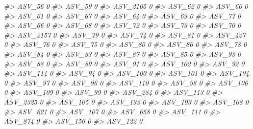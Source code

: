 \documentclass[
]{article}
\newenvironment{Shaded}{\begin{snugshade}}{\end{snugshade}}
\newcommand{\CommentTok}[1]{\textcolor[rgb]{0.56,0.35,0.01}{\textit{#1}}}
\begin{document}
\begin{Shaded}
\begin{Highlighting}[]
\CommentTok{\#\textgreater{} ASV\_56    0}
\CommentTok{\#\textgreater{} ASV\_59    0}
\CommentTok{\#\textgreater{} ASV\_2105  0}
\CommentTok{\#\textgreater{} ASV\_62    0}
\CommentTok{\#\textgreater{} ASV\_60    0}
\CommentTok{\#\textgreater{} ASV\_61    0}
\CommentTok{\#\textgreater{} ASV\_67    0}
\CommentTok{\#\textgreater{} ASV\_64    0}
\CommentTok{\#\textgreater{} ASV\_69    0}
\CommentTok{\#\textgreater{} ASV\_77    0}
\CommentTok{\#\textgreater{} ASV\_66    0}
\CommentTok{\#\textgreater{} ASV\_68    0}
\CommentTok{\#\textgreater{} ASV\_72    0}
\CommentTok{\#\textgreater{} ASV\_73    0}
\CommentTok{\#\textgreater{} ASV\_70    0}
\CommentTok{\#\textgreater{} ASV\_2157  0}
\CommentTok{\#\textgreater{} ASV\_79    0}
\CommentTok{\#\textgreater{} ASV\_74    0}
\CommentTok{\#\textgreater{} ASV\_81    0}
\CommentTok{\#\textgreater{} ASV\_427   0}
\CommentTok{\#\textgreater{} ASV\_76    0}
\CommentTok{\#\textgreater{} ASV\_75    0}
\CommentTok{\#\textgreater{} ASV\_80    0}
\CommentTok{\#\textgreater{} ASV\_86    0}
\CommentTok{\#\textgreater{} ASV\_78    0}
\CommentTok{\#\textgreater{} ASV\_84    0}
\CommentTok{\#\textgreater{} ASV\_83    0}
\CommentTok{\#\textgreater{} ASV\_87    0}
\CommentTok{\#\textgreater{} ASV\_85    0}
\CommentTok{\#\textgreater{} ASV\_93    0}
\CommentTok{\#\textgreater{} ASV\_88    0}
\CommentTok{\#\textgreater{} ASV\_89    0}
\CommentTok{\#\textgreater{} ASV\_91    0}
\CommentTok{\#\textgreater{} ASV\_102   0}
\CommentTok{\#\textgreater{} ASV\_92    0}
\CommentTok{\#\textgreater{} ASV\_114   0}
\CommentTok{\#\textgreater{} ASV\_94    0}
\CommentTok{\#\textgreater{} ASV\_100   0}
\CommentTok{\#\textgreater{} ASV\_101   0}
\CommentTok{\#\textgreater{} ASV\_104   0}
\CommentTok{\#\textgreater{} ASV\_97    0}
\CommentTok{\#\textgreater{} ASV\_96    0}
\CommentTok{\#\textgreater{} ASV\_110   0}
\CommentTok{\#\textgreater{} ASV\_98    0}
\CommentTok{\#\textgreater{} ASV\_106   0}
\CommentTok{\#\textgreater{} ASV\_109   0}
\CommentTok{\#\textgreater{} ASV\_99    0}
\CommentTok{\#\textgreater{} ASV\_284   0}
\CommentTok{\#\textgreater{} ASV\_113   0}
\CommentTok{\#\textgreater{} ASV\_2325  0}
\CommentTok{\#\textgreater{} ASV\_105   0}
\CommentTok{\#\textgreater{} ASV\_193   0}
\CommentTok{\#\textgreater{} ASV\_103   0}
\CommentTok{\#\textgreater{} ASV\_108   0}
\CommentTok{\#\textgreater{} ASV\_621   0}
\CommentTok{\#\textgreater{} ASV\_107   0}
\CommentTok{\#\textgreater{} ASV\_658   0}
\CommentTok{\#\textgreater{} ASV\_111   0}
\CommentTok{\#\textgreater{} ASV\_874   0}
\CommentTok{\#\textgreater{} ASV\_150   0}
\CommentTok{\#\textgreater{} ASV\_122   0}

\end{Highlighting}
\end{Shaded}
\end{document}
